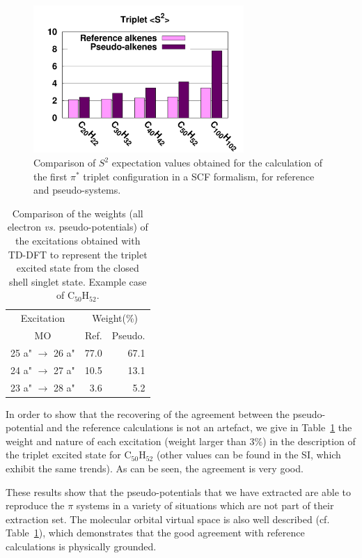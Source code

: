 \documentclass[aip]{revtex4-1}
\begin{document}
\begin{figure}
\begin{center}
\includegraphics[width=8cm]{long_pbe0_s2}
\end{center}
\caption{Comparison of $S^2$ expectation values obtained for the calculation
of the first $\pi^*$ triplet configuration in a SCF formalism, for reference
and pseudo-systems.}
\label{fig:ssquare}
\end{figure}

\begin{table}[ht]
\caption{\label{tab:coef}Comparison of the weights (all electron \emph{vs.} pseudo-potentials)
of the excitations obtained with TD-DFT
to represent the triplet excited state from the closed shell singlet state.
Example case of C$_{50}$H$_{52}$.}
\begin{tabular}{c c r r}
\hline\hline
\multicolumn{2}{c}{Excitation} & \multicolumn{2}{c}{Weight(\%)}\\
\multicolumn{2}{c}{MO} & Ref. & Pseudo.\\
\hline
\multicolumn{2}{c}{25 a" \(\rightarrow\) 26 a"} & 77.0 &   67.1  \\
\multicolumn{2}{c}{24 a" \(\rightarrow\) 27 a"} & 10.5 &   13.1  \\
\multicolumn{2}{c}{23 a" \(\rightarrow\) 28 a"} & 3.6  &    5.2  \\
\hline\hline
\end{tabular}
\end{table}

In order to show that the recovering of the agreement between the pseudo-potential
and the reference calculations is not an artefact, we give in Table~\ref{tab:coef}
the weight and nature of each excitation (weight larger than 3\%)
in the description of the triplet excited state for
C$_{50}$H$_{52}$ (other values can be found in the SI, which exhibit the same trends).
As can be seen, the agreement is very good. 

These results show that the pseudo-potentials that we have extracted are able to reproduce the
$\pi$ systems in a variety of situations which are not part of their extraction set.
The molecular orbital virtual space is also well described (cf. Table~\ref{tab:coef}),
which demonstrates that the good agreement with reference calculations is
physically grounded.
\end{document}

